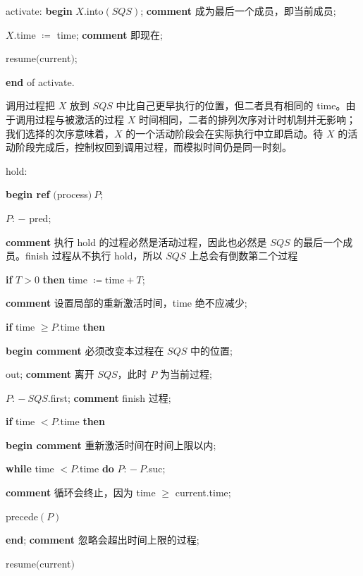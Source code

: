 \quad activate: \textbf{begin} $X$.into$(SQS)$; \textbf{comment} 成为最后一个成员，即当前成员;

\quad \quad $X$.time $\coloneq$ time; \textbf{comment} 即现在;

\quad \quad resume$($current$)$;

\quad \textbf{end} of activate.

\noindent
调用过程把 $X$ 放到 $SQS$ 中比自己更早执行的位置，但二者具有相同的 time。由于调用过程与被激活的过程 $X$ 时间相同，二者的排列次序对计时机制并无影响；我们选择的次序意味着，$X$ 的一个活动阶段会在实际执行中立即启动。待 $X$ 的活动阶段完成后，控制权回到调用过程，而模拟时间仍是同一时刻。

\quad hold:

\quad \textbf{begin ref} $($process$)\ P$;

\quad \quad $P$: $-$ pred;

\parindent\quad \quad \textbf{comment} 执行 hold 的过程必然是活动过程，因此也必然是 $SQS$ 的最后一个成员。finish 过程从不执行 hold，所以 $SQS$ 上总会有倒数第二个过程

\quad \quad \textbf{if} $T > 0$ \textbf{then} time $\coloneq \text{time} + T$;

\quad \quad \textbf{comment} 设置局部的重新激活时间，time 绝不应减少;

\quad \quad \textbf{if} time $\geqslant P$.time \textbf{then}

\quad \quad \quad \textbf{begin comment} 必须改变本过程在 $SQS$ 中的位置;

\quad \quad \quad \quad out; \textbf{comment} 离开 $SQS$，此时 $P$ 为当前过程;

\quad \quad \quad \quad $P$: $-\ SQS$.first; \textbf{comment} finish 过程;

\quad \quad \quad \quad \textbf{if} time $< P$.time \textbf{then}

\quad \quad \quad \quad \quad \textbf{begin comment} 重新激活时间在时间上限以内;

\quad \quad \quad \quad \quad \quad \textbf{while} time $< P$.time \textbf{do} $P$: $-\ P$.suc;

\quad \quad \quad \quad \quad \quad \textbf{comment} 循环会终止，因为 time $\geqslant$ current.time;

\quad \quad \quad \quad \quad \quad precede$(P)$

\quad \quad \quad \quad \quad \textbf{end}; \textbf{comment} 忽略会超出时间上限的过程;

\quad \quad \quad \quad resume$($current$)$

